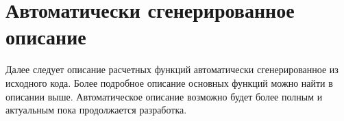\chapter{Автоматически сгенерированное описание}

Далее следует описание расчетных функций \unf автоматически сгенерированное из исходного кода.
Более подробное описание основных функций можно найти в описании выше. Автоматическое описание возможно будет более полным и актуальным пока продолжается разработка.